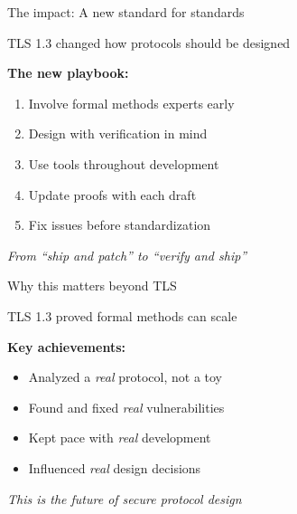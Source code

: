 \documentclass[aspectratio=169, lualatex, handout]{beamer}
\begin{document}
\begin{frame}{The impact: A new standard for standards}
	\begin{center}
		\Large
		TLS 1.3 changed how protocols should be designed
	\end{center}
	\vspace{1em}
	\textbf{The new playbook:}
	\begin{enumerate}
		\item Involve formal methods experts early
		\item Design with verification in mind
		\item Use tools throughout development
		\item Update proofs with each draft
		\item Fix issues before standardization
	\end{enumerate}
	\vspace{0.5em}
	\begin{center}
		\textit{From ``ship and patch'' to ``verify and ship''}
	\end{center}
\end{frame}

\begin{frame}{Why this matters beyond TLS}
	\begin{center}
		\Large
		TLS 1.3 proved formal methods can scale
	\end{center}
	\vspace{1em}
	\textbf{Key achievements:}
	\begin{itemize}
		\item Analyzed a \textit{real} protocol, not a toy
		\item Found and fixed \textit{real} vulnerabilities
		\item Kept pace with \textit{real} development
		\item Influenced \textit{real} design decisions
	\end{itemize}
	\vspace{0.5em}
	\begin{center}
		\textit{This is the future of secure protocol design}
	\end{center}
\end{frame}

\begin{frame}[plain]
	\titlepage
\end{frame}
\end{document}

